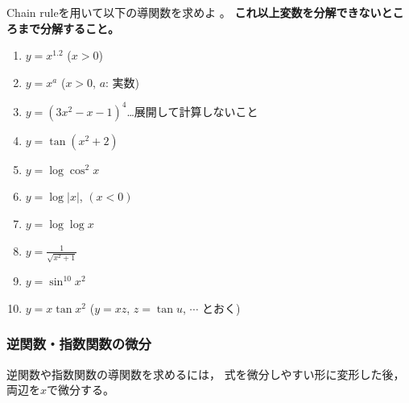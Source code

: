 \documentclass[twocolumn,11pt]{jarticle}
\begin{document}
\exercise
Chain ruleを用いて以下の導関数を求めよ
。
\textbf{これ以上変数を分解できないところまで分解すること。}

\begin{enumerate}
  \item \label{ditem:x^1.2}$y=x^{1.2}$ ($x>0$)
  \item \label{ditem:x^a}$y=x^a$ ($x>0$, $a$: 実数)
  \item \label{ditem:3x2-x-1}$y=(3x^2-x-1)^4$…展開して計算しないこと
  \item \label{ditem:tan(x2+2)}$y=\tan(x^2+2)$
  \item \label{ditem:logcos2x}$y=\log\cos^2x$
  \item \label{ditem:log|x|}$y=\log|x|$, $(x<0)$
  \item \label{ditem:loglogx}$y=\log\log x$
  \item \label{ditem:1/sqrt(x2+1)}$\displaystyle y=\frac{1}{\sqrt{x^2+1}}$
  \item \label{ditem:sin10x2}$y=\sin^{10}x^2$
  \item \label{ditem:xtan(x2)}$y=x\tan x^2$\quad
    ($y=xz$, $z=\tan u$, $\cdots$ とおく)
\end{enumerate}

\subsubsection{逆関数・指数関数の微分}
逆関数や指数関数の導関数を求めるには，
式を微分しやすい形に変形した後，両辺を$x$で微分する。
\end{document}
